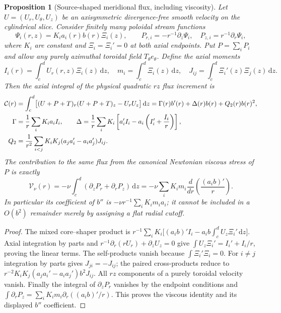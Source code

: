 \documentclass[11pt,a4paper]{article}
\theoremstyle{plain}
\newtheorem{proposition}[theorem]{Proposition}
\theoremstyle{definition}
\newcommand{\dd}{\,\mathrm{d}}
\begin{document}
\begin{proposition}[Source-shaped meridional flux, including viscosity]
\label{prop:shaper-shear}
Let $U=(U_r,U_\theta,U_z)$ be an axisymmetric divergence-free smooth
velocity on the cylindrical slice. Consider finitely many poloidal
stream functions
\[
 \Psi_i(r,z)=K_i a_i(r)b(r)\Xi_i(z),\qquad
 P_{r,i}=-r^{-1}\partial_z\Psi_i,\quad
 P_{z,i}=r^{-1}\partial_r\Psi_i,
\]
where $K_i$ are constant and $\Xi_i=\Xi_i'=0$ at both axial endpoints.
Put $P=\sum_iP_i$ and allow any purely azimuthal toroidal field
$T_\theta e_\theta$. Define the axial moments
\[
 I_i(r)=\int_c^d U_r(r,z)\Xi_i(z)\dd z,\quad
 m_i=\int_c^d\Xi_i(z)\dd z,\quad
 J_{ij}=\int_c^d\Xi_i'(z)\Xi_j(z)\dd z.
\]
Then the axial integral of the physical quadratic $rz$ flux increment is
\begin{align}
 \mathcal C(r)&=\int_c^d\bigl[(U+P+T)_r(U+P+T)_z-U_rU_z\bigr]\dd z
 =\Gamma(r)b'(r)+\Delta(r)b(r)+Q_2(r)b(r)^2,\notag\\
 \Gamma&=\frac1r\sum_iK_i a_iI_i,\qquad
 \Delta=\frac1r\sum_i K_i
 \left[a_i'I_i-a_i\left(I_i'+\frac{I_i}{r}\right)\right],\notag\\
 Q_2&=\frac1{r^2}\sum_{i<j}K_iK_j
  (a_j a_i'-a_i a_j')J_{ij}.\label{eq:shaper-source-flux}
\end{align}
The contribution to the same flux from the canonical Newtonian
viscous stress of $P$ is exactly
\begin{equation}\label{eq:shaper-viscous}
 \mathcal V_\nu(r)
 =-\nu\int_c^d(\partial_zP_r+\partial_rP_z)\dd z
 =-\nu\sum_iK_i m_i\frac{d}{dr}
  \left(\frac{(a_i b)'}r\right).
\end{equation}
In particular its coefficient of $b''$ is
$-\nu r^{-1}\sum_iK_i m_i a_i$; it cannot be included in a
$O(b^2)$ remainder merely by assigning a flat radial cutoff.
\end{proposition}

\begin{proof}
The mixed core--shaper product is
$r^{-1}\sum_iK_i\bigl[(a_i b)'I_i-
 a_i b\int_c^dU_z\Xi_i'\dd z\bigr]$.
Axial integration by parts and
$r^{-1}\partial_r(rU_r)+\partial_zU_z=0$ give
$\int U_z\Xi_i'=I_i'+I_i/r$, proving the linear terms.
The self-products vanish because $\int\Xi_i'\Xi_i=0$.
For $i\ne j$ integration by parts gives $J_{ji}=-J_{ij}$;
the paired cross-products reduce to
$r^{-2}K_iK_j(a_j a_i'-a_i a_j')b^2J_{ij}$.
All $rz$ components of a purely toroidal velocity vanish.
Finally the integral of $\partial_zP_r$ vanishes by the endpoint
conditions and
$\int\partial_rP_z=\sum_iK_i m_i\partial_r((a_i b)'/r)$.
This proves the viscous identity and its displayed $b''$ coefficient.
\end{proof}
\end{document}
